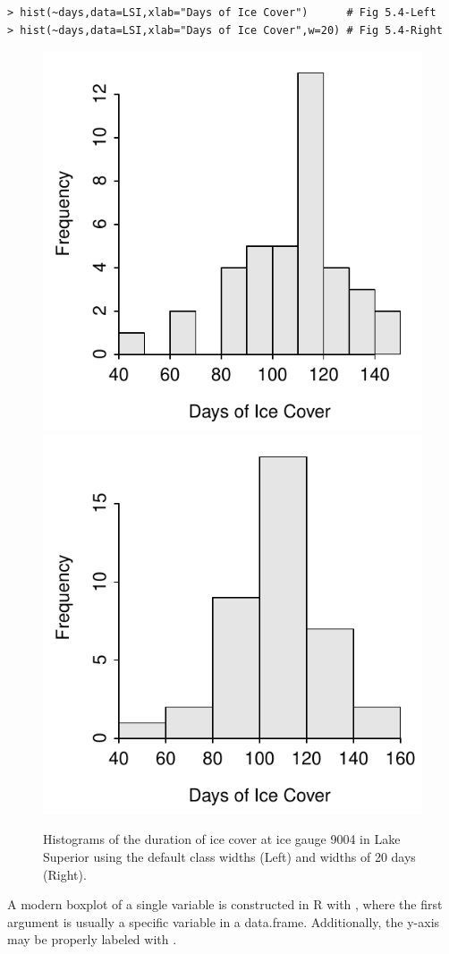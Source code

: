 \documentclass[10pt,openany]{book}\usepackage[]{graphicx}\usepackage[]{color}
\makeatletter
\newenvironment{kframe}{%
 \def\at@end@of@kframe{}%
 \ifinner\ifhmode%
  \def\at@end@of@kframe{\end{minipage}}%
  \begin{minipage}{\columnwidth}%
 \fi\fi%
 \def\FrameCommand##1{\hskip\@totalleftmargin \hskip-\fboxsep
 \colorbox{shadecolor}{##1}\hskip-\fboxsep
     \hskip-\linewidth \hskip-\@totalleftmargin \hskip\columnwidth}%
 \MakeFramed {\advance\hsize-\width
   \@totalleftmargin\z@ \linewidth\hsize
   \@setminipage}}%
 {\par\unskip\endMakeFramed%
 \at@end@of@kframe}
\newenvironment{knitrout}{}{} %
\makeatother
\begin{document}
\begin{knitrout}
\color{fgcolor}\begin{kframe}
\begin{verbatim}
> hist(~days,data=LSI,xlab="Days of Ice Cover")      # Fig 5.4-Left
> hist(~days,data=LSI,xlab="Days of Ice Cover",w=20) # Fig 5.4-Right
\end{verbatim}
\end{kframe}\begin{figure}[hbtp]

{\centering \includegraphics[width=.34\linewidth]{Figs/Histogram1-1} 
\includegraphics[width=.34\linewidth]{Figs/Histogram1-2} 

}

\caption[Histograms of the duration of ice cover at ice gauge 9004 in Lake Superior using the default class widths (Left) and widths of 20 days (Right)]{Histograms of the duration of ice cover at ice gauge 9004 in Lake Superior using the default class widths (Left) and widths of 20 days (Right).}\label{fig:Histogram1}
\end{figure}


\end{knitrout}

A modern boxplot of a single variable is constructed in R with , where the first argument is usually a specific variable in a data.frame. Additionally, the y-axis may be properly labeled with .
\end{document}
